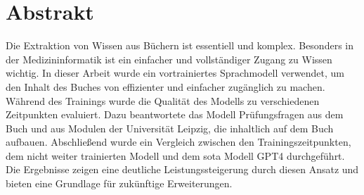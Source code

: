 \chapter*{Abstrakt}
Die Extraktion von Wissen aus Büchern ist essentiell und komplex.
Besonders in der Medizininformatik ist ein einfacher und vollständiger Zugang zu Wissen wichtig.
In dieser Arbeit wurde ein vortrainiertes Sprachmodell verwendet, um den Inhalt des Buches  von \citet{bb} effizienter und einfacher zugänglich zu machen.
Während des Trainings wurde die Qualität des Modells zu verschiedenen Zeitpunkten evaluiert.
Dazu beantwortete das Modell Prüfungsfragen aus dem Buch und aus Modulen der Universität Leipzig, die inhaltlich auf dem Buch aufbauen.
Abschließend wurde ein Vergleich zwischen den Trainingszeitpunkten, dem nicht weiter trainierten Modell und dem \ac{sota} Modell GPT4 durchgeführt.
Die Ergebnisse zeigen eine deutliche Leistungssteigerung durch diesen Ansatz und bieten eine Grundlage für zukünftige Erweiterungen.
\vfill
